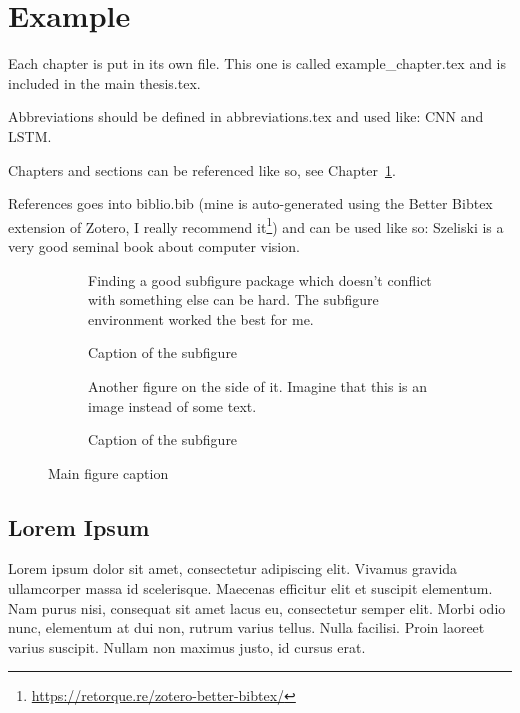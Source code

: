 \chapter{Example}
\label{chap:example}

Each chapter is put in its own file. This one is called example\_chapter.tex and is included in the main thesis.tex.

Abbreviations should be defined in abbreviations.tex and used like: \gls{CNN} and \gls{LSTM}.

Chapters and sections can be referenced like so, see Chapter~\ref{chap:example}.

References goes into biblio.bib (mine is auto-generated using the Better Bibtex extension of Zotero, I really recommend it\footnote{\url{https://retorque.re/zotero-better-bibtex/}}) and can be used like so: Szeliski \etal \cite{SzeliskiComputerVisionAlgorithms2011} is a very good seminal book about computer vision.

\begin{figure}
    \centering
    
    \begin{subfigure}[b]{.45\textwidth}
        \centering
        Finding a good subfigure package which doesn’t conflict with something else can be hard. The subfigure environment worked the best for me.
        \caption{Caption of the subfigure \label{fig:example:examplefigure:subfig1}}
    \end{subfigure}
    \begin{subfigure}[b]{.45\textwidth}
        \centering
        Another figure on the side of it. Imagine that this is an image instead of some text.
        \caption{Caption of the subfigure \label{fig:example:examplefigure:subfig2}}
    \end{subfigure}
    
    \caption{Main figure caption \label{fig:example:examplefigure}}
\end{figure}

\section{Lorem Ipsum}
\label{sec:lorem_ipsum}

Lorem ipsum dolor sit amet, consectetur adipiscing elit. Vivamus gravida ullamcorper massa id scelerisque. Maecenas efficitur elit et suscipit elementum. Nam purus nisi, consequat sit amet lacus eu, consectetur semper elit. Morbi odio nunc, elementum at dui non, rutrum varius tellus. Nulla facilisi. Proin laoreet varius suscipit. Nullam non maximus justo, id cursus erat.

